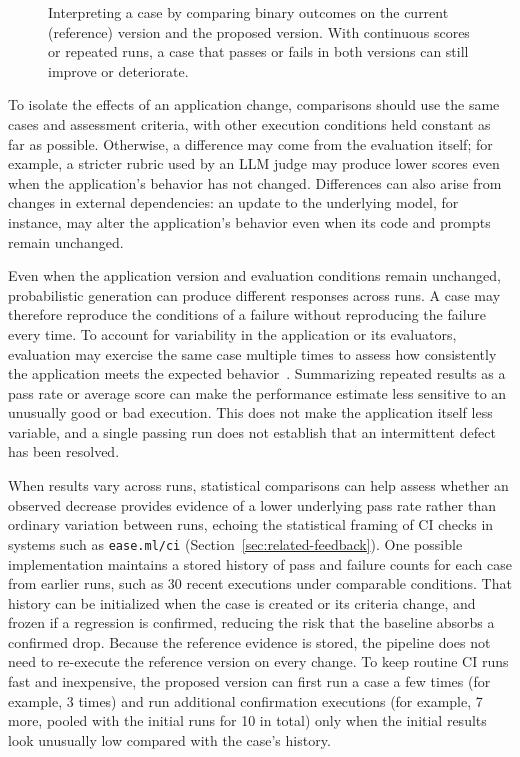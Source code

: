 \begin{figure}[htbp]
  \centering
  
  \caption{Interpreting a case by comparing binary outcomes on the current
    (reference) version and the proposed version. With continuous scores or
    repeated runs, a case that passes or fails in both versions can still
    improve or deteriorate.}
  \label{fig:cd4ai-result-interpretation}
\end{figure}

To isolate the effects of an application change, comparisons should use the
same cases and assessment criteria, with other execution conditions held
constant as far as possible. Otherwise, a difference may come from the
evaluation itself; for example, a stricter rubric used by an LLM judge may
produce lower scores even when the application's behavior has not changed.
Differences can also arise from changes in external dependencies: an update to
the underlying model, for instance, may alter the application's behavior even
when its code and prompts remain unchanged.

Even when the application version and evaluation conditions remain unchanged,
probabilistic generation can produce different responses across runs. A case
may therefore reproduce the conditions of a failure without reproducing the
failure every time. To account for
variability in the application or its evaluators, evaluation may exercise the
same case multiple times to assess how consistently the application meets the
expected behavior~\parencite{Grace:DemystifyingEvals:2026}. Summarizing repeated
results as a pass rate or average score can make the performance estimate less
sensitive to an unusually good or bad execution. This does not make the
application itself less variable, and a single passing run does not establish
that an intermittent defect has been resolved.

When results vary across runs, statistical comparisons can help assess whether
an observed decrease provides evidence of a lower underlying pass rate rather
than ordinary variation between runs, echoing the statistical framing of CI
checks in systems such as \texttt{ease.ml/ci}
(Section~\ref{sec:related-feedback}). One possible implementation maintains a
stored history of pass and failure counts for each case from earlier runs, such
as 30 recent executions under comparable conditions. That history can be
initialized when the case is created or its criteria change, and frozen if a
regression is confirmed, reducing the risk that the baseline absorbs a
confirmed drop. Because the reference evidence is
stored, the pipeline does not need to re-execute the reference version on every
change. To keep routine CI runs fast and inexpensive, the proposed version can
first run a case a few times (for example, 3 times) and run additional
confirmation executions (for example, 7 more, pooled with the initial runs for
10 in total) only when the initial results look unusually low compared with the
case's history.

